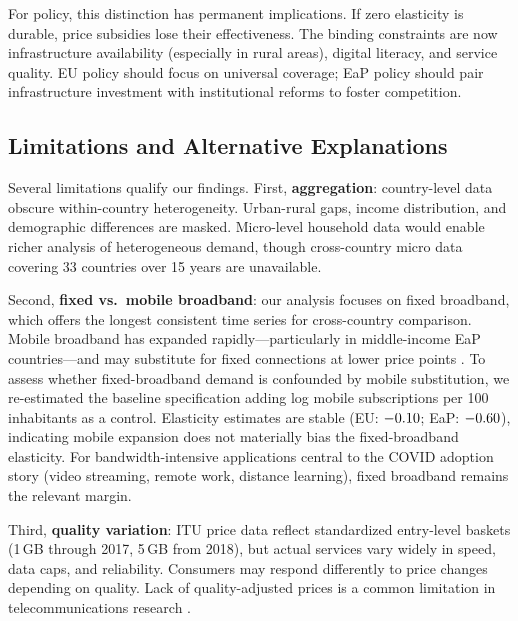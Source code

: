For policy, this distinction has permanent implications. If zero elasticity is durable,
price subsidies lose their effectiveness. The binding
constraints are now infrastructure availability (especially in rural areas),
digital literacy, and service quality. EU policy should focus
on universal coverage; EaP policy should pair infrastructure investment with
institutional reforms to foster competition.

\subsection{Limitations and Alternative Explanations}

Several limitations qualify our findings. First, \textbf{aggregation}: country-level data obscure within-country heterogeneity. Urban-rural gaps, income distribution, and demographic differences are masked. Micro-level household data would enable richer analysis of heterogeneous demand, though cross-country micro data covering 33 countries over 15 years are unavailable.

Second, \textbf{fixed vs.\ mobile broadband}: our analysis focuses on fixed broadband, which
offers the longest consistent time series for cross-country comparison. Mobile broadband has
expanded rapidly---particularly in middle-income EaP countries---and may substitute for fixed
connections at lower price points \citep{gruber2014mobile}. To assess whether fixed-broadband
demand is confounded by mobile substitution, we re-estimated the baseline specification
adding log mobile subscriptions per 100 inhabitants as a control. Elasticity estimates are
stable (EU: $-0.10$; EaP: $-0.60$), indicating mobile expansion does not materially bias
the fixed-broadband elasticity. For bandwidth-intensive applications central to the COVID
adoption story (video streaming, remote work, distance learning), fixed broadband remains
the relevant margin.

Third, \textbf{quality variation}: ITU price data reflect standardized entry-level baskets (1\,GB through 2017, 5\,GB from 2018), but actual services vary widely in speed, data caps, and reliability. Consumers may respond differently to price changes depending on quality. Lack of quality-adjusted prices is a common limitation in telecommunications research \citep{greenstein2016measuring}.

